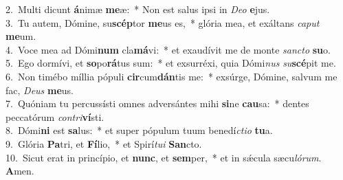 {2.~}Multi dicunt \textbf{á}nimæ \textbf{me}æ:~* Non est salus ipsi in \textit{De}\textit{o} \textbf{e}jus.\\
{3.~}Tu autem, Dómine, su\textbf{scép}tor \textbf{me}us es,~* glória mea, et exáltans \textit{ca}\textit{put} \textbf{me}um.\\
{4.~}Voce mea ad Dómi\textbf{num} cla\textbf{má}vi:~* et exaudívit me de monte \textit{san}\textit{cto} \textbf{su}o.\\
{5.~}Ego dormívi, et \textbf{so}po\textbf{rá}tus sum:~* et exsurréxi, quia Dómi\textit{nus} \textit{su}\textbf{scé}pit me.\\
{6.~}Non timébo míllia pópuli \textbf{cir}cum\textbf{dán}tis me:~* exsúrge, Dómine, salvum me fac, \textit{De}\textit{us} \textbf{me}us.\\
{7.~}Quóniam tu percussísti omnes adversántes mihi \textbf{si}ne \textbf{cau}sa:~* dentes peccatórum \textit{con}\textit{tri}\textbf{ví}sti.\\
{8.~}Dómi\textbf{ni} est \textbf{sa}lus:~* et super pópulum tuum benedí\textit{cti}\textit{o} \textbf{tu}a.\\
{9.~}Glória \textbf{Pa}tri, et \textbf{Fí}lio,~* et Spirí\textit{tu}\textit{i} \textbf{San}cto.\\
{10.~}Sicut erat in princípio, et \textbf{nunc}, et \textbf{sem}per,~* et in sǽcula sæcu\textit{ló}\textit{rum}. \textbf{A}men.\\
